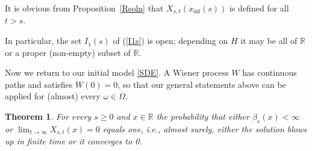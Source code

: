 \documentclass[sn-mathphys-num]{sn-jnl}
\newtheorem{thm}{Theorem}[section]
\newtheorem{prp}[thm]{Proposition}
\theoremstyle{definition}
\numberwithin{equation}{section} \theoremstyle{remark}
\def\R{\mathbb R}
\def\RR{\mathscr R}
\newcommand{\1}{\mathbbm{1}}
\begin{document}




It is obvious from Proposition~\ref{Rsoln} that
$X_{s,t}(x_{\inf}(s))$ is defined for all $t>s$.    

In particular, the set $I_1(s)$ of (\ref{I1s}) is open; depending on
$H$ it may be all of $\R$ or a proper (non-empty) subset of $\R$.


Now we return to our initial model \eqref{SDE}. A Wiener process $W$
has continuous paths and satisfies $W(0)=0$, so that our general
statements above can be applied for (almost) every
$\omega \in \Omega$.

\begin{thm}\label{1main}
  For every $s\geq 0$ and $x \in \R$ the probability that either
  $\beta_s(x)<\infty$ or $\lim_{t \to \infty}X_{s,t}(x)=0$ equals one,
  i.e., almost surely, either the solution blows up in finite time or
  it converges to 0.
\end{thm}
\end{document}
